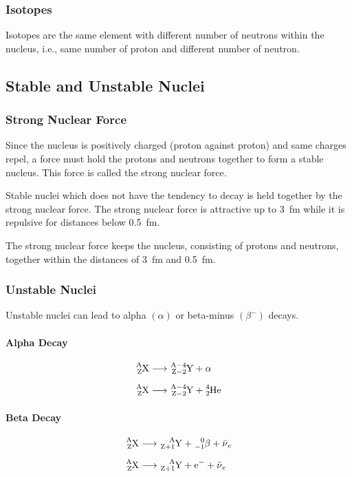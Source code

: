\documentclass[10pt]{article}
\begin{document}
\begin{multicols*}{2}
	\subsubsection{Isotopes}
	Isotopes are the same element with different number of neutrons within the
	nucleus, i.e., same number of proton and different number of neutron.

	\subsection{Stable and Unstable Nuclei}
	\subsubsection{Strong Nuclear Force}
	Since the nucleus is positively charged (proton against proton) and same charges
	repel, a force must hold the protons and neutrons together to form a stable
	nucleus. This force is called the strong nuclear force.
	\medskip

	Stable nuclei which does not have the tendency to decay is held together by
	the strong nuclear force. The strong nuclear force is attractive up to
	\qty{3}{\femto\meter} while it is repulsive for distances below
	\qty{0.5}{\femto\meter}.
	\medskip

	The strong nuclear force keeps the nucleus, consisting of protons and neutrons,
	together within the distances of \qty{3}{\femto\meter} and
	\qty{0.5}{\femto\meter}.

	\subsubsection{Unstable Nuclei}
	Unstable nuclei can lead to alpha $(\alpha)$ or beta-minus $(\beta^{-})$ decays.
	\paragraph{Alpha Decay}
	\begin{align}
		\ce{^A_ZX} & \longrightarrow \ce{^{A-4}_{Z-2}Y} + \alpha
		\\[\medskipamount]
		\ce{^A_ZX} & \longrightarrow \ce{^{A-4}_{Z-2}Y} + \ce{^{4}_{2}He}
	\end{align}

	\paragraph{Beta Decay}
	\begin{align}
		\ce{^A_ZX} & \longrightarrow \ce{^A_{Z+1}Y + \ce{^{0}_{-1}\beta} + \bar{\nu}_e}
		\\[\medskipamount]
		\ce{^A_ZX} & \longrightarrow \ce{^A_{Z+1}Y + e^{-} + \bar{\nu}_e}
	\end{align}


\end{multicols*}
\end{document}
